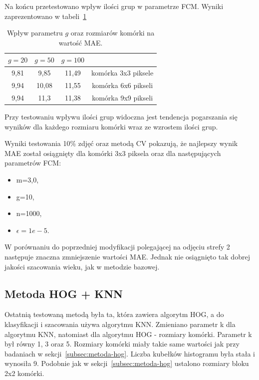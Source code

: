 \documentclass[a4paper,twoside,12pt]{book}
\begin{document}
    Na końcu przetestowano wpływ ilości grup w parametrze FCM.
    Wyniki zaprezentowano w tabeli~\ref{tab.hog21}
    \begin{table}[]
        \centering
        \caption{Wpływ parametru $g$ oraz rozmiarów komórki na wartość MAE.}
        \begin{tabular}{|c|c|c|c|}
            \hline
            $g=20$ & $g=50$ & $g=100$ &                     \\ \hline
            9,81 & 9,85 & 11,49 & komórka 3x3 piksele \\ \hline
            9,94 & 10,08 & 11,55 & komórka 6x6 pikseli \\ \hline
            9,94 & 11,3 & 11,38 & komórka 9x9 pikseli \\ \hline
        \end{tabular}
        \label{tab.hog21}
    \end{table}

    Przy testowaniu wpływu ilości grup widoczna jest tendencja pogarszania się wyników dla każdego rozmiaru komórki
    wraz ze wzrostem ilości grup.

    Wyniki testowania 10\% zdjęć oraz metodą CV pokazują, że najlepszy wynik MAE został osiągnięty dla komórki 3x3
    piksela oraz dla następujących parametrów FCM:
    \begin{itemize}
        \item m=3,0,
        \item g=10,
        \item n=1000,
        \item $\epsilon=1e-5$.
    \end{itemize}

    W porównaniu do poprzedniej modyfikacji polegającej na odjęciu strefy 2 następuje znaczna zmniejszenie
    wartości MAE.
    Jednak nie osiągnięto tak dobrej jakości szacowania wieku, jak w metodzie bazowej.

    \subsection{Metoda HOG + KNN}\label{subsec:metoda-hog-+-knn}
    Ostatnią testowaną metodą była ta, która zawiera algorytm HOG, a do klasyfikacji i szacowania używa algorytmu KNN.
    Zmieniano parametr k dla algorytmu KNN, natomiast dla algorytmu HOG - rozmiary komórki.
    Parametr k był równy 1, 3 oraz 5. Rozmiary komórki miały takie same wartości jak przy badaniach w
    sekcji~\ref{subsec:metoda-hog}.
    Liczba kubełków histogramu była stała i wynosiła 9. Podobnie jak w sekcji~\ref{subsec:metoda-hog} ustalono rozmiary
    bloku 2x2 komórki.
\end{document}
